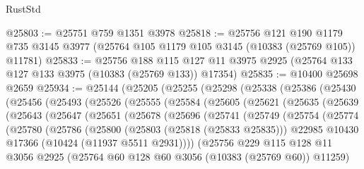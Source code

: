 \begin{lexlean}{RustStd}
\begin{coremodule}
@25803 := @25751 @759 @1351 @3978
@25818 := @25756
    @121
    @190
    @1179
    @735
    @3145
    @3977
    (@25764 @105 @1179 @105 @3145 (@10383 (@25769 @105)) @11781)
@25833 := @25756
    @188
    @115
    @127
    @11
    @3975
    @2925
    (@25764 @133 @127 @133 @3975 (@10383 (@25769 @133)) @17354)
@25835 := @10400 @25698 @2659
@25934 := @25144
    (@25205
      (@25255
        (@25298
          (@25338
            (@25386
              (@25430
                (@25456
                  (@25493
                    (@25526
                      (@25555
                        (@25584
                          (@25605
                            (@25621
                              (@25635
                                (@25639
                                  (@25643
                                    (@25647
                                      (@25651
                                        (@25678
                                          (@25696
                                            (@25741
                                              (@25749
                                                (@25754
                                                  (@25774
                                                    (@25780
                                                      (@25786
                                                        (@25800
                                                          (@25803 (@25818 (@25833 @25835)))
                                                          @22985
                                                          @10430
                                                          @17366
                                                          (@10424 (@11937 @5511 @2931))))
                                                      (@25756
                                                        @229
                                                        @115
                                                        @128
                                                        @11
                                                        @3056
                                                        @2925
                                                        (@25764
                                                          @60
                                                          @128
                                                          @60
                                                          @3056
                                                          (@10383 (@25769 @60))
                                                          @11259)

\end{coremodule}
\end{lexlean}
